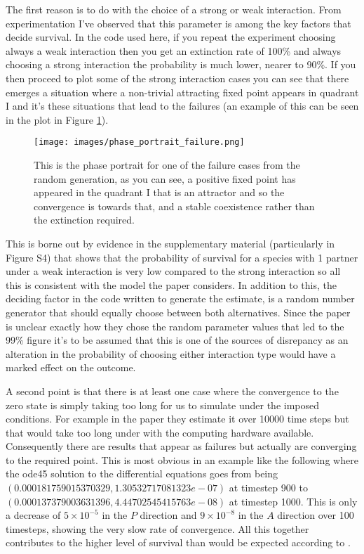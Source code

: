 \documentclass[11pt]{scrreprt}
\begin{document}
\begin{enumerate}
		The first reason is to do with the choice of a strong or weak interaction. From experimentation I've observed that this parameter is among the key factors that decide survival. In the code used here, if you repeat the experiment choosing always a weak interaction then you get an extinction rate of 100\% and always choosing a strong interaction the probability is much lower, nearer to 90\%. If you then proceed to plot some of the strong interaction cases you can see that there emerges a situation where a non-trivial attracting fixed point appears in quadrant I and it's these situations that lead to the failures (an example of this can be seen in the plot in Figure \ref{fig:phase_plot}).
		
		\begin{figure}[ht]
			\begin{center}
				\texttt{[image: images/phase\_portrait\_failure.png]}
			\end{center}
			\caption{This is the phase portrait for one of the failure cases from the random generation, as you can see, a positive fixed point has appeared in the quadrant I that is an attractor and so the convergence is towards that, and a stable coexistence rather than the extinction required.}
			\label{fig:phase_plot}
		\end{figure}
		
		
		This is borne out by evidence in the supplementary material (particularly in Figure S4) that shows that the probability of survival for a species with 1 partner under a weak interaction is very low compared to the strong interaction so all this is consistent with the model the paper considers. In addition to this, the deciding factor in the code written to generate the estimate, is a random number generator that should equally choose between both alternatives. Since the paper is unclear exactly how they chose the random parameter values that led to the 99\% figure it's to be assumed that this is one of the sources of disrepancy as an alteration in the probability of choosing either interaction type would have a marked effect on the outcome. 
		
		A second point is that there is at least one case where the convergence to the zero state is simply taking too long for us to simulate under the imposed conditions. For example in the paper they estimate it over 10000 time steps but that would take too long under with the computing hardware available. Consequently there are results that appear as failures but actually are converging to the required point. This is most obvious in an example like the following where the ode45 solution to the differential equations goes from being $(0.000181759015370329,	1.30532717081323e-07)$ at timestep 900 to $(0.000137379003631396,	4.44702545415763e-08)$ at timestep 1000. This is only a decrease of $5 \times 10^{-5}$ in the $P$ direction and $9 \times 10^{-8}$ in the $A$ direction over 100 timesteps, showing the very slow rate of convergence. All this together contributes to the higher level of survival than would be expected according to \citet{James2012}.
		

\end{enumerate}
\end{document}
